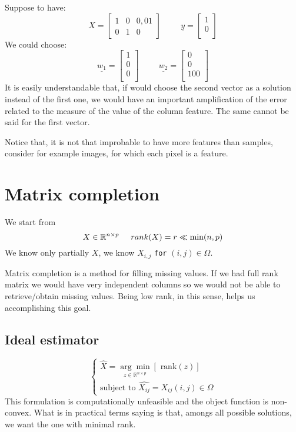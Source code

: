 \noindent Suppose to have:
\[
    X = 
\begin{bmatrix}
    1 & 0 & 0,01\\
    0 & 1 & 0
\end{bmatrix}
\hspace{1cm}
\underline{y} = 
\begin{bmatrix}
    1\\
    0\\
\end{bmatrix}    
\]
We could choose:
\[
    \underline{w_1} = \begin{bmatrix}
        1\\
        0\\
        0\\
    \end{bmatrix}
    \hspace{1cm}
    \underline{w_2} = \begin{bmatrix}
        0\\
        0\\
        100\\
    \end{bmatrix}
\]
It is easily understandable that, if would choose the second vector as a solution instead of the first one, we would have an important amplification of the error related to the measure of the value of the column feature. The same cannot be said for the first vector.

Notice that, it is not that improbable to have more features than samples, consider for example images, for which each pixel is a feature.

\section{Matrix completion}
We start from 
\[
    X \in \mathbb{R}^{n \times p}  \hspace{0.5cm} rank(X) = r \ll \min(n,p) 
\]
We know only partially $X$, we know $X_{i,j}$ \texttt{for} $(i,j) \in \Omega$. 

Matrix completion is a method for filling missing values. If we had full rank matrix we would have very independent columns so we would not be able to retrieve/obtain missing values. Being low rank, in this sense, helps us accomplishing this goal.  

\subsection{Ideal estimator}
\[
    \begin{cases}
        \hat{X} = \underset{z \in \mathbb{R}^{n \times p}}{\arg \min} \left[\text{ rank}(z)\right]\\
        \text{subject to } \hat{X_{ij}} = X_{ij} (i,j) \in \Omega
    \end{cases}    
\]
This formulation is computationally unfeasible and the object function is non-convex. What is in practical terms saying is that, amongs all possible solutions, we want the one with minimal rank.


